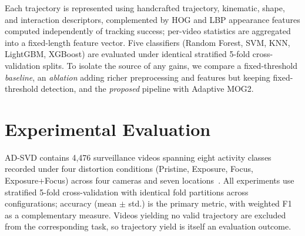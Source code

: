 \documentclass[runningheads]{llncs}
\begin{document}
Each trajectory is represented using handcrafted trajectory, kinematic, shape, and interaction descriptors, complemented by HOG and LBP appearance features computed independently of tracking success; per-video statistics are aggregated into a fixed-length feature vector. Five classifiers (Random Forest, SVM, KNN, LightGBM, XGBoost) are evaluated under identical stratified 5-fold cross-validation splits. To isolate the source of any gains, we compare a fixed-threshold \emph{baseline}, an \emph{ablation} adding richer preprocessing and features but keeping fixed-threshold detection, and the \emph{proposed} pipeline with Adaptive MOG2.

\section{Experimental Evaluation}

AD-SVD contains 4,476 surveillance videos spanning eight activity classes recorded under four distortion conditions (Pristine, Exposure, Focus, Exposure+Focus) across four cameras and seven locations~\cite{9698081}. All experiments use stratified 5-fold cross-validation with identical fold partitions across configurations; accuracy (mean $\pm$ std.) is the primary metric, with weighted F1 as a complementary measure. Videos yielding no valid trajectory are excluded from the corresponding task, so trajectory yield is itself an evaluation outcome.
\begin{table}[htbp]
\centering
\caption{\textbf{Key results by configuration} (5-fold cross-validation, best classifier per configuration). Baseline: fixed-threshold MOG2. Ablation: fixed-threshold MOG2 with richer preprocessing/features. Proposed: Adaptive MOG2.}
\label{tab:key}
\end{table}
\end{document}
